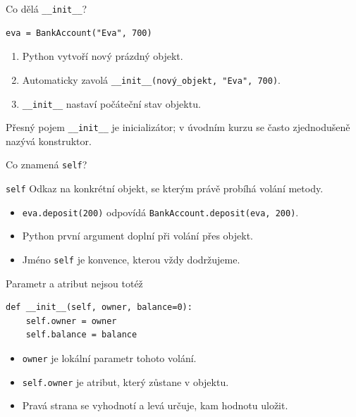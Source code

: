 \documentclass[aspectratio=169]{beamer}
\begin{document}
\begin{frame}[fragile]{Co dělá \texttt{\_\_init\_\_}?}
\begin{lstlisting}[style=python]
eva = BankAccount("Eva", 700)
\end{lstlisting}
  \begin{enumerate}
    \item Python vytvoří nový prázdný objekt.
    \item Automaticky zavolá \texttt{\_\_init\_\_(nový\_objekt, "Eva", 700)}.
    \item \texttt{\_\_init\_\_} nastaví počáteční stav objektu.
  \end{enumerate}
  \begin{alertblock}{Přesný pojem}
    \texttt{\_\_init\_\_} je inicializátor; v úvodním kurzu se často zjednodušeně nazývá konstruktor.
  \end{alertblock}
\end{frame}

\begin{frame}{Co znamená \texttt{self}?}
  \begin{block}{\texttt{self}}
    Odkaz na konkrétní objekt, se kterým právě probíhá volání metody.
  \end{block}
  \begin{itemize}
    \item \texttt{eva.deposit(200)} odpovídá \texttt{BankAccount.deposit(eva, 200)}.
    \item Python první argument doplní při volání přes objekt.
    \item Jméno \texttt{self} je konvence, kterou vždy dodržujeme.
  \end{itemize}
\end{frame}

\begin{frame}[fragile]{Parametr a atribut nejsou totéž}
\begin{lstlisting}[style=python]
def __init__(self, owner, balance=0):
    self.owner = owner
    self.balance = balance
\end{lstlisting}
  \begin{itemize}
    \item \texttt{owner} je lokální parametr tohoto volání.
    \item \texttt{self.owner} je atribut, který zůstane v objektu.
    \item Pravá strana se vyhodnotí a levá určuje, kam hodnotu uložit.
  \end{itemize}
\end{frame}
\end{document}
